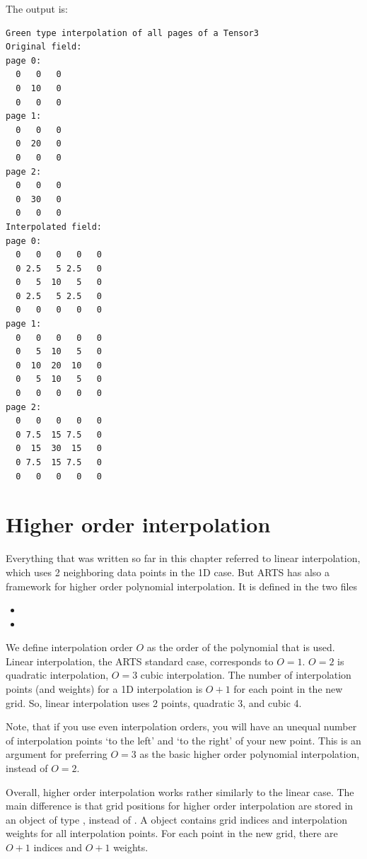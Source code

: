 \hspace{-\parindent}The output is:

\begin{lstlisting}
Green type interpolation of all pages of a Tensor3
Original field:
page 0:
  0   0   0
  0  10   0
  0   0   0
page 1:
  0   0   0
  0  20   0
  0   0   0
page 2:
  0   0   0
  0  30   0
  0   0   0
Interpolated field:
page 0:
  0   0   0   0   0
  0 2.5   5 2.5   0
  0   5  10   5   0
  0 2.5   5 2.5   0
  0   0   0   0   0
page 1:
  0   0   0   0   0
  0   5  10   5   0
  0  10  20  10   0
  0   5  10   5   0
  0   0   0   0   0
page 2:
  0   0   0   0   0
  0 7.5  15 7.5   0
  0  15  30  15   0
  0 7.5  15 7.5   0
  0   0   0   0   0
\end{lstlisting}


\section{Higher order interpolation}

Everything that was written so far in this chapter referred to linear
interpolation, which uses 2 neighboring data points in the 1D
case. But ARTS has also a framework for higher order polynomial
interpolation. It is defined in the two files

\begin{itemize}
\item {}
\item {}
\end{itemize}

We define interpolation order $O$ as the order of the polynomial that
is used. Linear interpolation, the ARTS standard case, corresponds to
$O=1$. $O=2$ is quadratic interpolation, $O=3$ cubic interpolation.
The number of interpolation points (and weights) for a 1D
interpolation is $O+1$ for each point in the new grid. So, linear
interpolation uses 2 points, quadratic 3, and cubic 4.

Note, that if you use even interpolation orders, you will have an
unequal number of interpolation points `to the left' and `to the
right' of your new point. This is an argument for preferring $O=3$ as the
basic higher order polynomial interpolation, instead of $O=2$.

Overall, higher order interpolation works rather similarly to the
linear case.  The main difference is that grid positions for higher
order interpolation are stored in an object of type
, instead of . A
 object contains grid indices and interpolation
weights for all interpolation points. For each point in the new grid,
there are $O+1$ indices and $O+1$ weights.

